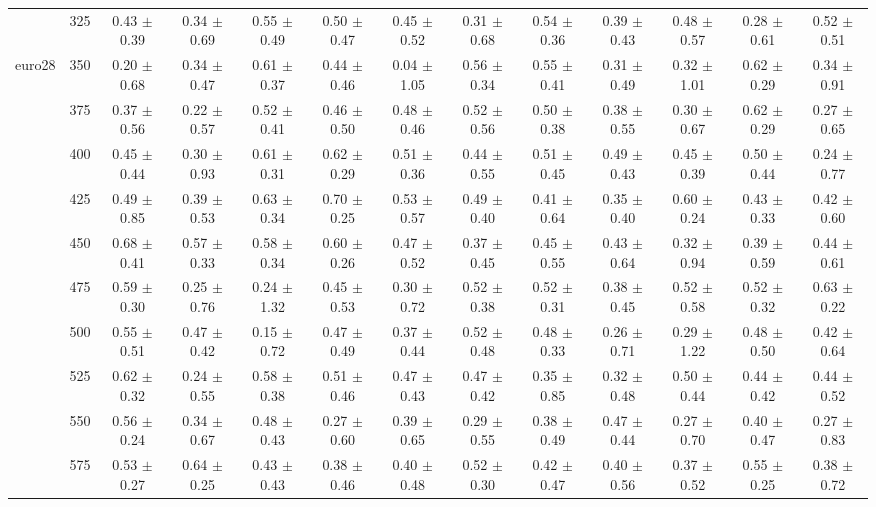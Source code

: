 \begin{table}[h]
{\begin{tabular}{
        ccccccccccccc}
 & 325& 0.43 $\pm$ 0.39& 0.34 $\pm$ 0.69& 0.55 $\pm$ 0.49& 0.50 $\pm$ 0.47& 0.45 $\pm$ 0.52& 0.31 $\pm$ 0.68& 0.54 $\pm$ 0.36& 0.39 $\pm$ 0.43& 0.48 $\pm$ 0.57& 0.28 $\pm$ 0.61& 0.52 $\pm$ 0.51 \\ 
\multirow{4}{*}{euro28}& 350& 0.20 $\pm$ 0.68& 0.34 $\pm$ 0.47& 0.61 $\pm$ 0.37& 0.44 $\pm$ 0.46& 0.04 $\pm$ 1.05& 0.56 $\pm$ 0.34& 0.55 $\pm$ 0.41& 0.31 $\pm$ 0.49& 0.32 $\pm$ 1.01& 0.62 $\pm$ 0.29& 0.34 $\pm$ 0.91 \\ 
 & 375& 0.37 $\pm$ 0.56& 0.22 $\pm$ 0.57& 0.52 $\pm$ 0.41& 0.46 $\pm$ 0.50& 0.48 $\pm$ 0.46& 0.52 $\pm$ 0.56& 0.50 $\pm$ 0.38& 0.38 $\pm$ 0.55& 0.30 $\pm$ 0.67& 0.62 $\pm$ 0.29& 0.27 $\pm$ 0.65 \\ 
 & 400& 0.45 $\pm$ 0.44& 0.30 $\pm$ 0.93& 0.61 $\pm$ 0.31& 0.62 $\pm$ 0.29& 0.51 $\pm$ 0.36& 0.44 $\pm$ 0.55& 0.51 $\pm$ 0.45& 0.49 $\pm$ 0.43& 0.45 $\pm$ 0.39& 0.50 $\pm$ 0.44& 0.24 $\pm$ 0.77 \\ 
 & 425& 0.49 $\pm$ 0.85& 0.39 $\pm$ 0.53& 0.63 $\pm$ 0.34& 0.70 $\pm$ 0.25& 0.53 $\pm$ 0.57& 0.49 $\pm$ 0.40& 0.41 $\pm$ 0.64& 0.35 $\pm$ 0.40& 0.60 $\pm$ 0.24& 0.43 $\pm$ 0.33& 0.42 $\pm$ 0.60 \\ 
 & 450& 0.68 $\pm$ 0.41& 0.57 $\pm$ 0.33& 0.58 $\pm$ 0.34& 0.60 $\pm$ 0.26& 0.47 $\pm$ 0.52& 0.37 $\pm$ 0.45& 0.45 $\pm$ 0.55& 0.43 $\pm$ 0.64& 0.32 $\pm$ 0.94& 0.39 $\pm$ 0.59& 0.44 $\pm$ 0.61 \\ 
 & 475& 0.59 $\pm$ 0.30& 0.25 $\pm$ 0.76& 0.24 $\pm$ 1.32& 0.45 $\pm$ 0.53& 0.30 $\pm$ 0.72& 0.52 $\pm$ 0.38& 0.52 $\pm$ 0.31& 0.38 $\pm$ 0.45& 0.52 $\pm$ 0.58& 0.52 $\pm$ 0.32& 0.63 $\pm$ 0.22 \\ 
 & 500& 0.55 $\pm$ 0.51& 0.47 $\pm$ 0.42& 0.15 $\pm$ 0.72& 0.47 $\pm$ 0.49& 0.37 $\pm$ 0.44& 0.52 $\pm$ 0.48& 0.48 $\pm$ 0.33& 0.26 $\pm$ 0.71& 0.29 $\pm$ 1.22& 0.48 $\pm$ 0.50& 0.42 $\pm$ 0.64 \\ 
 & 525& 0.62 $\pm$ 0.32& 0.24 $\pm$ 0.55& 0.58 $\pm$ 0.38& 0.51 $\pm$ 0.46& 0.47 $\pm$ 0.43& 0.47 $\pm$ 0.42& 0.35 $\pm$ 0.85& 0.32 $\pm$ 0.48& 0.50 $\pm$ 0.44& 0.44 $\pm$ 0.42& 0.44 $\pm$ 0.52 \\ 
 & 550& 0.56 $\pm$ 0.24& 0.34 $\pm$ 0.67& 0.48 $\pm$ 0.43& 0.27 $\pm$ 0.60& 0.39 $\pm$ 0.65& 0.29 $\pm$ 0.55& 0.38 $\pm$ 0.49& 0.47 $\pm$ 0.44& 0.27 $\pm$ 0.70& 0.40 $\pm$ 0.47& 0.27 $\pm$ 0.83 \\ 
 & 575& 0.53 $\pm$ 0.27& 0.64 $\pm$ 0.25& 0.43 $\pm$ 0.43& 0.38 $\pm$ 0.46& 0.40 $\pm$ 0.48& 0.52 $\pm$ 0.30& 0.42 $\pm$ 0.47& 0.40 $\pm$ 0.56& 0.37 $\pm$ 0.52& 0.55 $\pm$ 0.25& 0.38 $\pm$ 0.72 \\ 

\end{tabular}}
\end{table}
